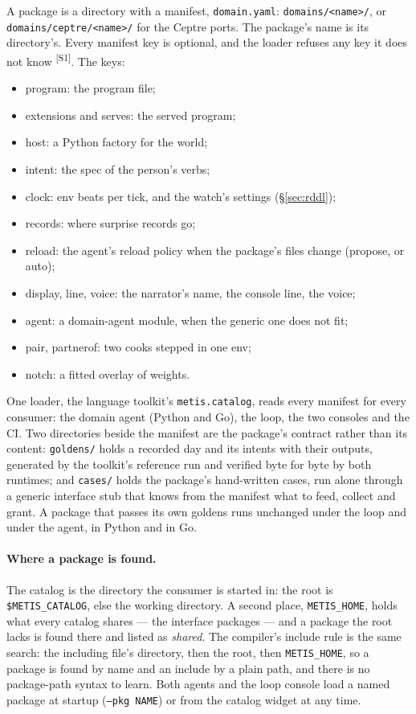 \documentclass[11pt]{article}
\newcommand{\tool}[1]{{\ttfamily\begingroup\def\_{\textunderscore\allowbreak}#1\endgroup}}
\newcommand{\src}[1]{\textsuperscript{[#1]}}
\begin{document}
A package is a directory with a manifest, \texttt{domain.yaml}:
\texttt{domains/<name>/}, or \texttt{domains/ceptre/<name>/} for the
Ceptre ports. The package's name is its directory's. Every
manifest key is optional, and the loader refuses any key it does not know
\src{S1}. The keys:
\begin{itemize}[nosep]
\item \tool{program}: the program file;
\item \tool{extensions} and \tool{serves}: the served program;
\item \tool{host}: a Python factory for the world;
\item \tool{intent}: the spec of the person's verbs;
\item \tool{clock}: env beats per tick, and the watch's settings (\S\ref{sec:rddl});
\item \tool{records}: where surprise records go;
\item \tool{reload}: the agent's reload policy when the package's files change (propose, or auto);
\item \tool{display}, \tool{line}, \tool{voice}: the narrator's name, the console line, the voice;
\item \tool{agent}: a domain-agent module, when the generic one does not fit;
\item \tool{pair}, \tool{partner\_of}: two cooks stepped in one env;
\item \tool{notch}: a fitted overlay of weights.
\end{itemize}
One loader, the language toolkit's \texttt{metis.catalog}, reads every
manifest for every consumer: the domain agent (Python and Go), the loop,
the two consoles and the CI. Two directories beside the manifest are the
package's contract rather than its content: \texttt{goldens/} holds a
recorded day and its intents with their outputs, generated by the
toolkit's reference run and verified byte for byte by both runtimes; and
\texttt{cases/} holds the package's hand-written cases, run alone through
a generic interface stub that knows from the manifest what to feed,
collect and grant. A package that passes its own goldens runs unchanged
under the loop and under the agent, in Python and in Go.

\paragraph{Where a package is found.} The catalog is the directory the
consumer is started in: the root is \texttt{\$METIS\_CATALOG}, else the
working directory. A second place, \texttt{METIS\_HOME}, holds what every
catalog shares --- the interface packages --- and a package the root lacks
is found there and listed as \emph{shared}. The compiler's include rule
is the same search: the including file's directory, then the root, then
\texttt{METIS\_HOME}, so a package is found by name and an include by a
plain path, and there is no package-path syntax to learn. Both agents and
the loop console load a named package at startup (\texttt{--pkg NAME})
or from the catalog widget at any time.
\end{document}
